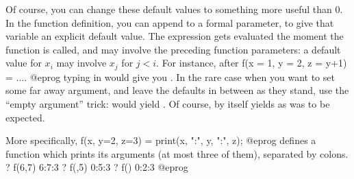 Of course, you can change these default values to something more useful than
$0$. In the function definition, you can append \kbd{=} to a formal
parameter, to give that variable an explicit default value. The expression
gets evaluated the moment the function is called, and may involve the
preceding function parameters: a default value for $x_i$ may involve $x_j$
for $j < i$. For instance, after
\bprog
f(x = 1, y = 2, z = y+1) = ....
@eprog\noindent
typing in  would give you . In the rare case when
you want to set some far away argument, and leave the defaults in between as
they stand, use the ``empty argument'' trick:  would yield
. Of course,  by itself yields  as was
to be expected.

More specifically,
\bprog
f(x, y=2, z=3) = print(x, ":", y, ":", z);
@eprog
\noindent defines a function which prints its arguments (at most three of
them), separated by colons.
\bprog
? f(6,7)
6:7:3
? f(,5)
0:5:3
? f()
0:2:3
@eprog

